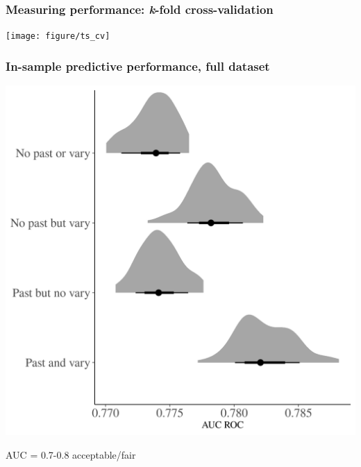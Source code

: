 \documentclass{beamer}
\begin{document}
\begin{frame}
  \frametitle{Measuring performance: \textit{k}-fold cross-validation}

  \begin{center}
    \texttt{[image: figure/ts\_cv]}
  \end{center}


\end{frame}

%
%
%

\begin{frame}
  \frametitle{In-sample predictive performance, full dataset}

  \begin{center}
    \includegraphics[width=\textwidth,height=0.8\textheight,keepaspectratio=true]{../results/figure/auc_hist}

    \footnotesize{AUC = 0.7-0.8 acceptable/fair}
  \end{center}

\end{frame}
\end{document}
